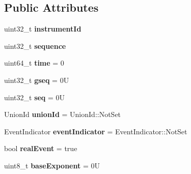 \subsection*{Public Attributes}
\begin{DoxyCompactItemize}
\item 
\mbox{\label{structvxa__feed_1_1_vxa_event_a51e3dd99853db9a1041e31bf30c722f9}} 
uint32\+\_\+t {\bfseries instrument\+Id}
\item 
\mbox{\label{structvxa__feed_1_1_vxa_event_a0ae5e808d5c1a2b58b6936dbd85cc72b}} 
uint32\+\_\+t {\bfseries sequence}
\item 
\mbox{\label{structvxa__feed_1_1_vxa_event_a1754a662f20229e3cb479be564b48f45}} 
uint64\+\_\+t {\bfseries time} = 0
\item 
\mbox{\label{structvxa__feed_1_1_vxa_event_a7639056fc5c891cc5e530f8e49885d6f}} 
uint32\+\_\+t {\bfseries gseq} = 0U
\item 
\mbox{\label{structvxa__feed_1_1_vxa_event_acfde21af086d55404c53f863b741a2f6}} 
uint32\+\_\+t {\bfseries seq} = 0U
\item 
\mbox{\label{structvxa__feed_1_1_vxa_event_ae9514a1fc1e05049b99829710a27b446}} 
Union\+Id {\bfseries union\+Id} = Union\+Id\+::\+Not\+Set
\item 
\mbox{\label{structvxa__feed_1_1_vxa_event_a37739bc886b3946bbc0de581a164c6ed}} 
Event\+Indicator {\bfseries event\+Indicator} = Event\+Indicator\+::\+Not\+Set
\item 
\mbox{\label{structvxa__feed_1_1_vxa_event_af3a00af0c2859eb43fb69389943881cf}} 
bool {\bfseries real\+Event} = true
\item 
\mbox{\label{structvxa__feed_1_1_vxa_event_af23a2f545f1f41e7c751b93737c673ec}} 
uint8\+\_\+t {\bfseries base\+Exponent} = 0U
\item 
\mbox{\label{structvxa__feed_1_1_vxa_event_a6694e8765462001cf9e7bee60caa8d7c}} 

\end{DoxyCompactItemize}

